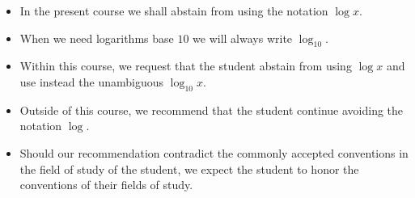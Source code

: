 \begin{frame}
\begin{emptyTheorem}
\begin{itemize}
\item \alert<1->{In the present course we shall abstain from using the notation $\log x$. }
\item When we need logarithms base $10$ we will always write $\log_{10}$.
\end{itemize}
\end{emptyTheorem}

\begin{itemize}
\item Within this course, we request that the student abstain from using $\log x$ and use instead the unambiguous $\log_{10} x$.
\item Outside of this course, we recommend that the student continue avoiding the notation $\log$.
\item Should our recommendation contradict the commonly accepted conventions in the field of study of the student, we expect the student to honor the conventions of their fields of study.
\end{itemize}
\end{frame}
